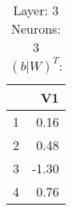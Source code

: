 \begin{table}[ht]
\centering
\begin{tabular}{rr}
  \hline
 & V1 \\ 
  \hline
1 & 0.16 \\ 
  2 & 0.48 \\ 
  3 & -1.30 \\ 
  4 & 0.76 \\ 
   \hline
\end{tabular}
\caption{Layer: 3 Neurons: 3  $(b|W)^T$: 
} 
\end{table}
